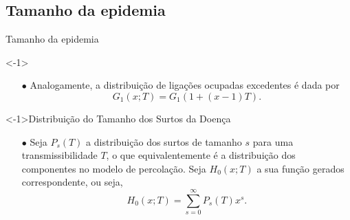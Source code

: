\documentclass{beamer}
\begin{document}



\subsection{Tamanho da epidemia}
\begin{frame}{Tamanho da epidemia}

\begin{exampleblock}
    <-1>{}
    \begin{itemize}

        \item[$\bullet$] Analogamente, a distribuição de ligações ocupadas excedentes é dada por 
            \begin{equation}
                G_1(x;T) = G_1(1 +(x-1)T).
            \end{equation}
    \end{itemize}

\end{exampleblock}

\begin{exampleblock}
    <-1>{Distribuição do Tamanho dos Surtos da Doença}
    \begin{itemize}

        \item[$\bullet$] Seja $P_s (T)$ a distribuição dos surtos 
            de tamanho $s$ para uma transmissibilidade $T$, o que equivalentemente é 
            a distribuição dos componentes no modelo de 
            percolação. Seja $H_0 (x; T)$ a sua função gerados correspondente, ou seja, 
            \begin{equation}
                H_0 (x; T)= \sum_{s=0}^\infty P_s (T) x^s.
            \end{equation}

    \end{itemize}
\end{exampleblock}


\end{frame}

\end{document}
